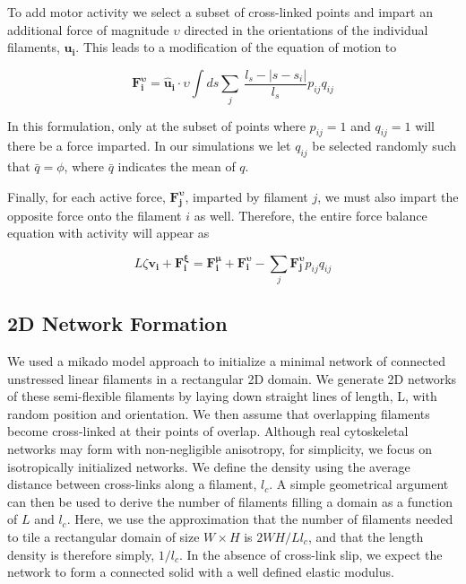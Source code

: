 \documentclass[10pt,letterpaper]{article}
\begin{document}
To add motor activity we select a subset of cross-linked points and impart an additional force of magnitude $\upsilon$ directed in the orientations of the individual filaments, $\mathbf{u_i}$.  This leads to a modification of the equation of motion to

\begin{equation}
\label{eqn:moto}
\mathbf{F^{\upsilon}_i}= \mathbf{\hat{u}_i}\cdot\upsilon\int ds \sum _j \:  \frac{l_s-|s-s_i|}{l_s} p_{ij}q_{ij}
\end{equation}

In this formulation, only at the subset of points where  $p_{ij}=1$ and $q_{ij}=1$ will there be a force imparted.  In our simulations we let $q_{ij}$ be selected randomly such that $\bar{q}=\phi$, where $\bar{q}$ indicates the mean of $q$.

Finally, for each active force, $\mathbf{F^{\upsilon}_j}$, imparted by filament $j$, we must also impart the opposite force onto the filament $i$ as well.  Therefore, the entire force balance equation with activity will appear as

\begin{equation}
\label{eqn:syst3}
L\zeta\mathbf{ v_i} +\mathbf{F^{\xi}_i}= \mathbf{F^{\mu}_i}+\mathbf{F^{\upsilon}_i} - \sum_{j}\mathbf{F^{\upsilon}_j}p_{ij}q_{ij}
\end{equation}

\subsection*{2D Network Formation}

We used a mikado model approach \cite{Unterberger2014} to initialize a minimal network of connected unstressed linear filaments in a rectangular 2D domain. We generate 2D networks of these semi-flexible filaments by laying down straight lines of length, L, with random position and orientation. We then assume that overlapping filaments become cross-linked at their points of overlap. Although real cytoskeletal networks may form with non-negligible anisotropy, for simplicity, we focus on isotropically initialized networks. We define the density using the average distance between cross-links along a filament, $l_c$. A simple geometrical argument can then be used to derive the number of filaments filling a domain as a function of $L$ and $l_c$\cite{theo_hlm}.  Here, we use the approximation that the number of filaments needed to tile a rectangular domain of size $W \times H$  is $2WH/Ll_c$, and that the length density is therefore simply, $1/l_c$. In the absence of cross-link slip, we expect the network to form a connected solid with a well defined elastic modulus\cite{theo_hlm,theo_hlm2}.
\end{document}
